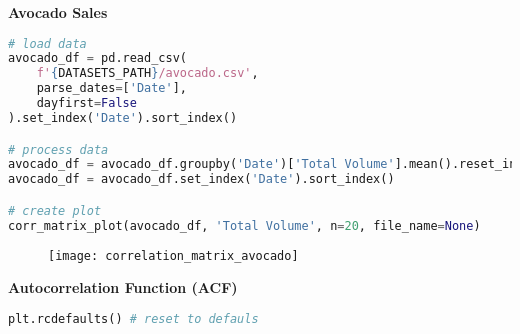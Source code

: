 {\noindent\hspace{-12.5pt}\normalsize\bfseries Avocado Sales}\vspace{-10pt}
\begin{center}
  \begin{lstlisting}[language=Python, 
  caption={Диагональная корреляционная матрица объема продаж авокадо.}, 
  label={lst:correlation_matrix_avocado}]
# load data
avocado_df = pd.read_csv(
    f'{DATASETS_PATH}/avocado.csv',
    parse_dates=['Date'],
    dayfirst=False
).set_index('Date').sort_index()

# process data
avocado_df = avocado_df.groupby('Date')['Total Volume'].mean().reset_index()
avocado_df = avocado_df.set_index('Date').sort_index()

# create plot
corr_matrix_plot(avocado_df, 'Total Volume', n=20, file_name=None)
  \end{lstlisting}
\end{center}

\begin{figure}[h!]
  \centering
  \texttt{[image: correlation\_matrix\_avocado]}
\end{figure}


\begin{center}
  \noindent\normalsize\bfseries
  Autocorrelation Function (ACF)
\end{center}\vspace{-17.5pt}

\begin{center}
  \begin{lstlisting}[language=Python]
plt.rcdefaults() # reset to defauls
  \end{lstlisting}
\end{center}

